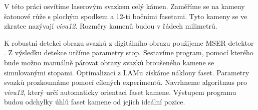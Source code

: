  	V této práci osvítíme laserovým svazkem celý kámen. Zaměříme se na kameny šatonové růže s plochým spodkem a 12-ti bočními fasetami. Tyto kameny se ve zkratce nazývají \textit{viva12}. Rozměry kamenů budou v řádech milimetrů. 
	
	K robustní detekci obrazu svazků z digitálního obrazu použijeme MSER detektor \cite{Matas}. Z výsledku detekce určíme parametry stop. Sestavíme program, pomocí kterého bude možno manuálně párovat obrazy svazků broušeného kamene se simulovanými stopami.
 Optimalizací z LAMu získáme náklony faset. Parametry svazků prozkoumáme pomocí cílených experimentů. Navrhneme algoritmus pro \textit{vivu12}, který určí automaticky orientaci faset kamene. Výstupem programu budou odchylky úhlů faset kamene od jejich ideální pozice.




 
 
 
 \clearpage
 